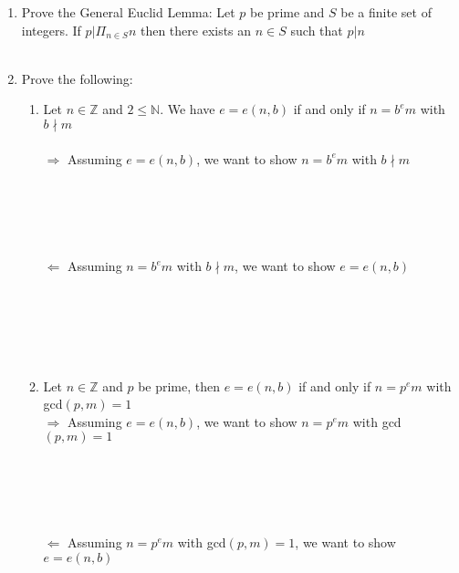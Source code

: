 \documentclass[11pt]{article}
\begin{document}
\begin{enumerate}
\begin{enumerate}
\end{enumerate}

\newpage %
\item Prove the General Euclid Lemma: Let $p$ be prime and $S$ be a finite set of integers.  If $p|\Pi_{n \in S}n$ then there exists an $n \in S$ such that $p | n$
\\
\\

\newpage %
\item Prove the following:
\begin{enumerate}
\item Let $n \in \mathbb{Z}$ and $2 \leq \mathbb{N}$.  We have $e = e(n,b)$ if and only if $n = b^em$ with $b \nmid m$\\
\\
$\Rightarrow$ Assuming $e = e(n,b)$, we want to show $n = b^em$ with $b \nmid m$\\
\\
\\
\\
\\
\\

$\Leftarrow$ Assuming $n = b^em$ with $b \nmid m$, we want to show $e = e(n,b)$\\
\\
\\
\\
\\
\\

\item Let $n \in \mathbb{Z}$ and $p$ be prime, then $e = e(n,b)$ if and only if $n = p^em$ with gcd$(p,m) = 1$\\
$\Rightarrow$ Assuming $e = e(n,b)$, we want to show $n = p^em$ with gcd$(p,m) = 1$\\
\\
\\
\\
\\
\\

$\Leftarrow$ Assuming $n = p^em$ with gcd$(p,m) = 1$, we want to show $e = e(n,b)$\\
\\
\\
\\
\\
\\

\end{enumerate}



\end{enumerate}
\end{document}

